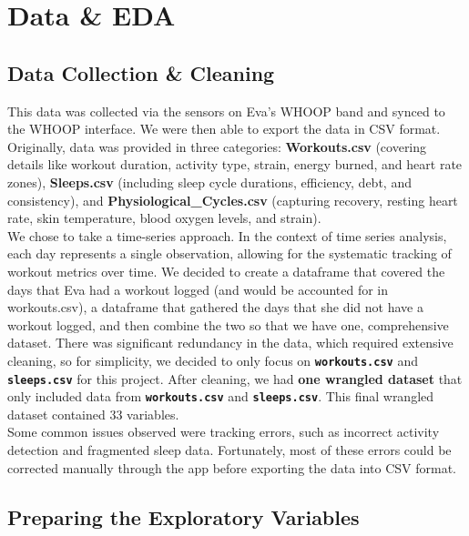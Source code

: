 \documentclass{article}
\begin{document}
\section{\hspace{0.5em} Data \& EDA}

\subsection{ \hspace{0.5em} \hspace{0.5em} Data Collection \& Cleaning}

This data was collected via the sensors on Eva's WHOOP band and synced to the WHOOP interface. We were then able to export the data in CSV format. Originally, data was provided in three categories: \textbf{Workouts.csv} (covering details like workout duration, activity type, strain, energy burned, and heart rate zones), \textbf{Sleeps.csv} (including sleep cycle durations, efficiency, debt, and consistency), and \textbf{Physiological\_Cycles.csv} (capturing recovery, resting heart rate, skin temperature, blood oxygen levels, and strain). \\

We chose to take a time-series approach. In the context of time series analysis, each day represents a single observation, allowing for the systematic tracking of workout metrics over time. We decided to create a dataframe that covered the days that Eva had a workout logged (and would be accounted for in workouts.csv), a dataframe that gathered the days that she did not have a workout logged, and then combine the two so that we have one, comprehensive dataset. There was significant redundancy in the data, which required extensive cleaning, so for simplicity, we decided to only focus on \textbf{\texttt{workouts.csv}} and \texttt{\textbf{sleeps.csv}} for this project. After cleaning, we had \textbf{one wrangled dataset} that only included data from \textbf{\texttt{workouts.csv}} and \texttt{\textbf{sleeps.csv}}. This final wrangled dataset contained 33 variables. \\

Some common issues observed were tracking errors, such as incorrect activity detection and fragmented sleep data. Fortunately, most of these errors could be corrected manually through the app before exporting the data into CSV format. 

\subsection{ {Preparing the Exploratory Variables}}
\end{document}
